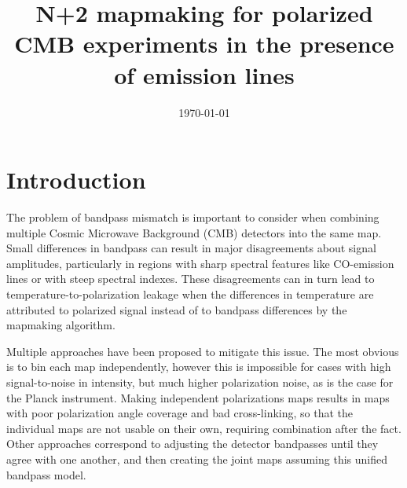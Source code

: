 \documentclass{aa}
\begin{document}
 


   \title{N+2 mapmaking for polarized CMB experiments in the presence of emission lines}

   

  

   \date{\today} 
   
   
   \maketitle
   
\section{Introduction}

The problem of bandpass mismatch is important to consider when combining multiple Cosmic Microwave Background (CMB) detectors into the same map. Small differences in bandpass can result in major disagreements about signal amplitudes, particularly in regions with sharp spectral features like CO-emission lines or with steep spectral indexes. These disagreements can in turn lead to temperature-to-polarization leakage when the differences in temperature are attributed to polarized signal instead of to bandpass differences by the mapmaking algorithm. 

Multiple approaches have been proposed to mitigate this issue. The most obvious is to bin each map independently, however this is impossible for cases with high signal-to-noise in intensity, but much higher polarization noise, as is the case for the Planck instrument. Making independent polarizations maps results in maps with poor polarization angle coverage and bad cross-linking, so that the individual maps are not usable on their own, requiring combination after the fact. Other approaches correspond to adjusting the detector bandpasses until they agree with one another, and then creating the joint maps assuming this unified bandpass model. 
\end{document}
